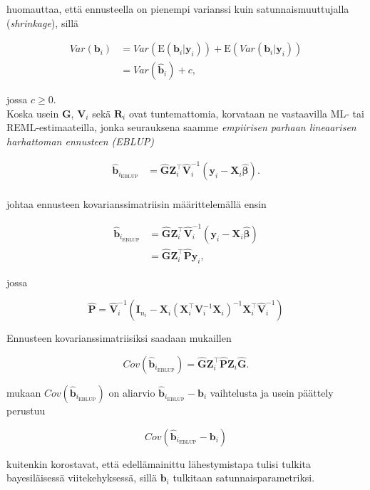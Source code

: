 \documentclass[finnish]{docopts}
\begin{document}
\cite{nissinen09} huomauttaa, että ennusteella on pienempi varianssi kuin satunnaismuuttujalla (\textit{shrinkage}), sillä

$$
\begin{aligned}
Var(\bm{b}_i) &= Var(\text{E}(\bm{b}_i | \bm{y}_i)) + \text{E}(Var(\bm{b}_i | \bm{y}_i)) \\
&= Var(\hat{\bm{b}}_i) + c,
\end{aligned}
$$

jossa $c \geq 0$.\\

Koska usein $\bm{G}$, $\bm{V}_{i}$ sekä $\bm{R}_i$ ovat tuntemattomia, korvataan ne vastaavilla ML- tai REML-estimaateilla, jonka seurauksena saamme \textit{empiirisen parhaan lineaarisen harhattoman ennusteen (EBLUP)}

$$
\begin{aligned}
\hat{\bm{b}}_{i_\text{EBLUP}} &= \hat{\bm{G}} \bm{Z}_{i}^\top \hat{\bm{V}}_{i}^{-1}(\bm{y}_i - \bm{X}_i \hat{\bm{\beta}}). \\
\end{aligned}
$$

\cite{nissinen09} johtaa ennusteen kovarianssimatriisin määrittelemällä ensin

$$
\begin{aligned}
\hat{\bm{b}}_{i_\text{EBLUP}} &= \hat{\bm{G}} \bm{Z}_{i}^\top \hat{\bm{V}}_{i}^{-1}(\bm{y}_i - \bm{X}_i \hat{\bm{\beta}})\\
&= \hat{\bm{G}} \bm{Z}_{i}^\top \hat{\bm{P}}\bm{y}_i,
\end{aligned}
$$

jossa 

$$
\hat{\bm{P}} = \hat{\bm{V}}_{i}^{-1}(\bm{I}_{n_i} - \bm{X}_{i} (\bm{X}_{i}^\top \bm{V}_{i}^{-1} \bm{X}_{i})^{-1} \bm{X}_{i}^\top \hat{\bm{V}}_{i}^{-1})
$$

Ennusteen kovarianssimatriisiksi saadaan mukaillen

$$
Cov(\hat{\bm{b}}_{i_\text{EBLUP}}) = \hat{\bm{G}} \bm{Z}_{i}^\top \hat{\bm{P}} \bm{Z}_{i} \hat{\bm{G}}.
$$

\cite{verbeke00} mukaan $Cov(\hat{\bm{b}}_{i_\text{EBLUP}})$ on aliarvio $\hat{\bm{b}}_{i_\text{EBLUP}} - \bm{b}_{i}$ vaihtelusta ja usein päättely perustuu

$$
Cov(\hat{\bm{b}}_{i_\text{EBLUP}} - \bm{b}_{i})
$$

\cite{verbeke00} kuitenkin korostavat, että edellämainittu lähestymistapa tulisi tulkita bayesiläisessä viitekehyksessä, sillä $\bm{b}_{i}$ tulkitaan satunnaisparametriksi. \\
\end{document}
